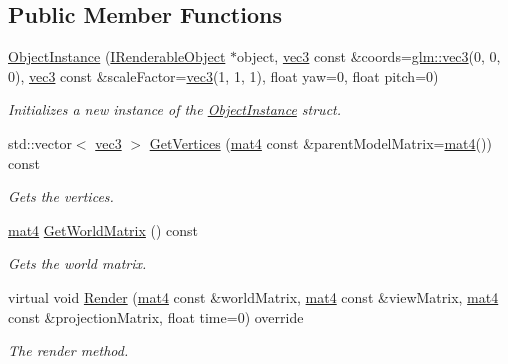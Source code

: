 \subsection*{Public Member Functions}
\begin{DoxyCompactItemize}
\item 
\hyperlink{class_object_instance_abc93e8022756b412663cfdfdb4101ab3}{Object\+Instance} (\hyperlink{class_i_renderable_object}{I\+Renderable\+Object} $\ast$object, \hyperlink{_types_8h_a3d0ce73e3199de81565fb01632415288}{vec3} const \&coords=\hyperlink{_types_8h_a3d0ce73e3199de81565fb01632415288}{glm\+::vec3}(0, 0, 0), \hyperlink{_types_8h_a3d0ce73e3199de81565fb01632415288}{vec3} const \&scale\+Factor=\hyperlink{_types_8h_a3d0ce73e3199de81565fb01632415288}{vec3}(1, 1, 1), float yaw=0, float pitch=0)
\begin{DoxyCompactList}\small\item\em Initializes a new instance of the \hyperlink{class_object_instance}{Object\+Instance} struct. \end{DoxyCompactList}\item 
std\+::vector$<$ \hyperlink{_types_8h_a3d0ce73e3199de81565fb01632415288}{vec3} $>$ \hyperlink{class_object_instance_ab9de0b3252e0df4c15129876163dad6d}{Get\+Vertices} (\hyperlink{_types_8h_a2db59f395fe82a7394c6324956c265d8}{mat4} const \&parent\+Model\+Matrix=\hyperlink{_types_8h_a2db59f395fe82a7394c6324956c265d8}{mat4}()) const 
\begin{DoxyCompactList}\small\item\em Gets the vertices. \end{DoxyCompactList}\item 
\hyperlink{_types_8h_a2db59f395fe82a7394c6324956c265d8}{mat4} \hyperlink{class_object_instance_aa9a660435b76ef436a5dcdb24d897c4f}{Get\+World\+Matrix} () const 
\begin{DoxyCompactList}\small\item\em Gets the world matrix. \end{DoxyCompactList}\item 
virtual void \hyperlink{class_object_instance_a5aab17f4111ca91e123f9485c616aa6f}{Render} (\hyperlink{_types_8h_a2db59f395fe82a7394c6324956c265d8}{mat4} const \&world\+Matrix, \hyperlink{_types_8h_a2db59f395fe82a7394c6324956c265d8}{mat4} const \&view\+Matrix, \hyperlink{_types_8h_a2db59f395fe82a7394c6324956c265d8}{mat4} const \&projection\+Matrix, float time=0) override
\begin{DoxyCompactList}\small\item\em The render method. \end{DoxyCompactList}\item 

\end{DoxyCompactItemize}
